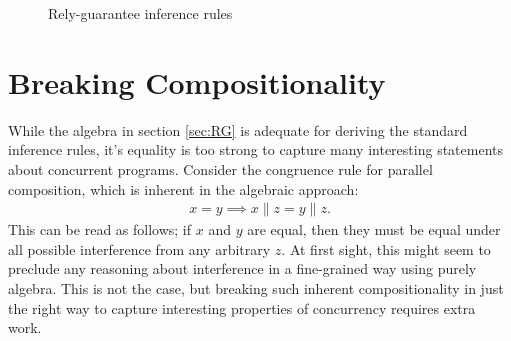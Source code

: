 \documentclass{llncs}
\begin{document}
\begin{figure}[tbh]
\centering
\begin{prooftree}
\end{prooftree}

\begin{prooftree}
\end{prooftree}

\begin{prooftree}
\end{prooftree}

\begin{prooftree}
\end{prooftree}

\begin{prooftree}
\end{prooftree}

\begin{prooftree}
\end{prooftree}
\caption{Rely-guarantee inference rules}
\label{fig:rgrules}
\end{figure}

\section{Breaking Compositionality}
\label{sec:INT}

While the algebra in section \ref{sec:RG} is adequate for deriving the
standard inference rules, it's equality is too strong to capture many
interesting statements about concurrent programs. Consider the
congruence rule for parallel composition, which is inherent in the
algebraic approach:
\begin{align*}
x = y \implies x\|z = y\|z.
\end{align*}
This can be read as follows; if $x$ and $y$ are equal, then they must
be equal under all possible interference from any arbitrary $z$. At
first sight, this might seem to preclude any reasoning about
interference in a fine-grained way using purely algebra. This is not
the case, but breaking such inherent compositionality in just the
right way to capture interesting properties of concurrency requires
extra work.
\end{document}
